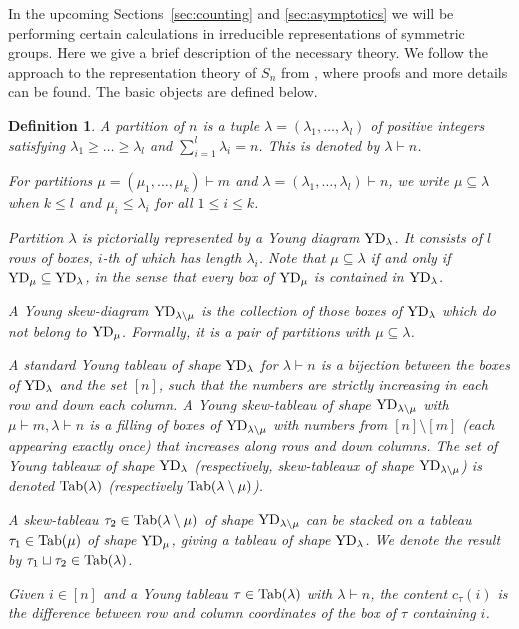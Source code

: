 \documentclass{amsart}
\newtheorem{definition}[conjecture]{Definition}
\newcommand{\tn}{\textnormal}
\begin{document}
In the upcoming Sections~\ref{sec:counting} and \ref{sec:asymptotics} we will be performing certain calculations in irreducible representations of symmetric groups. Here we give a brief description of the necessary theory. We follow the approach to the representation theory of $S_n$ from \cite{new_approach_rep_theory_sym_gps_OkounkovVershik96}, where proofs and more details can be found. The basic objects are defined below.
\begin{definition}\label{def:rep_Sn}
A \emph{partition} of $n$ is a tuple $\lambda=(\lambda_1,\dots,\lambda_l)$ of positive integers satisfying $\lambda_1\geqslant\dots\geqslant\lambda_l$ and $\sum_{i=1}^l\lambda_i=n$. This is denoted by $\lambda\vdash n$.

For partitions $\mu=(\mu_1,\dots,\mu_k)\vdash m$ and $\lambda=(\lambda_1,\dots,\lambda_l)\vdash n$, we write $\mu\subseteq\lambda$ when $k\leqslant l$ and $\mu_i\leqslant\lambda_i$ for all $1\leqslant i\leqslant k$.

Partition $\lambda$ is pictorially represented by a \emph{Young diagram} $\tn{YD}_\lambda$. It consists of $l$ rows of boxes, $i$-th of which has length $\lambda_i$. Note that $\mu\subseteq\lambda$ if and only if $\tn{YD}_\mu\subseteq\tn{YD}_\lambda$, in the sense that every box of $\tn{YD}_\mu$ is contained in $\tn{YD}_\lambda$.

A \emph{Young skew-diagram} $\tn{YD}_{\lambda\setminus\mu}$ is the collection of those boxes of $\tn{YD}_\lambda$ which do not belong to $\tn{YD}_\mu$. Formally, it is a pair of partitions with $\mu\subseteq\lambda$.

A \emph{standard Young tableau} of shape $\tn{YD}_\lambda$ for $\lambda\vdash n$ is a bijection between the boxes of $\tn{YD}_\lambda$ and the set $[n]$, such that the numbers are strictly increasing in each row and down each column. A \emph{Young skew-tableau} of shape $\tn{YD}_{\lambda\setminus\mu}$ with $\mu\vdash m,\lambda\vdash n$ is a filling of boxes of $\tn{YD}_{\lambda\setminus\mu}$ with numbers from $[n]\setminus[m]$ (each appearing exactly once) that increases along rows and down columns. The set of Young tableaux of shape $\tn{YD}_\lambda$ (respectively, skew-tableaux of shape $\tn{YD}_{\lambda\setminus\mu}$) is denoted $\tn{Tab}(\lambda)$ (respectively $\tn{Tab}(\lambda\setminus\mu)$).

A skew-tableau $\tau_2\in\tn{Tab}(\lambda\setminus\mu)$ of shape $\tn{YD}_{\lambda\setminus\mu}$ can be stacked on a tableau $\tau_1\in\tn{Tab}(\mu)$ of shape $\tn{YD}_\mu$, giving a tableau of shape $\tn{YD}_\lambda$. We denote the result by $\tau_1\sqcup\tau_2\in\tn{Tab}(\lambda)$.

Given $i\in[n]$ and a Young tableau $\tau\in\tn{Tab}(\lambda)$ with $\lambda\vdash n$, the \emph{content} $c_\tau(i)$ is the difference between row and column coordinates of the box of $\tau$ containing $i$.
\end{definition}
\end{document}
